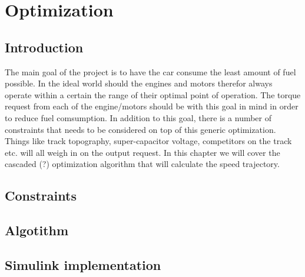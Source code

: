 \chapter{Optimization}
\section{Introduction}
The main goal of the project is to have the car consume the least amount of fuel possible. In the ideal world should the engines and motors therefor always operate within a certain the range of their optimal point of operation. The torque request from each of the engine/motors should be with this goal in mind in order to reduce fuel comsumption. In addition to this goal, there is a number of constraints that needs to be considered on top of this generic optimization. Things like track topography, super-capacitor voltage, competitors on the track etc. will all weigh in on the output request. In this chapter we will cover the cascaded (?) optimization algorithm that will calculate the speed trajectory.

\section{Constraints}

\section{Algotithm}

\section{Simulink implementation}